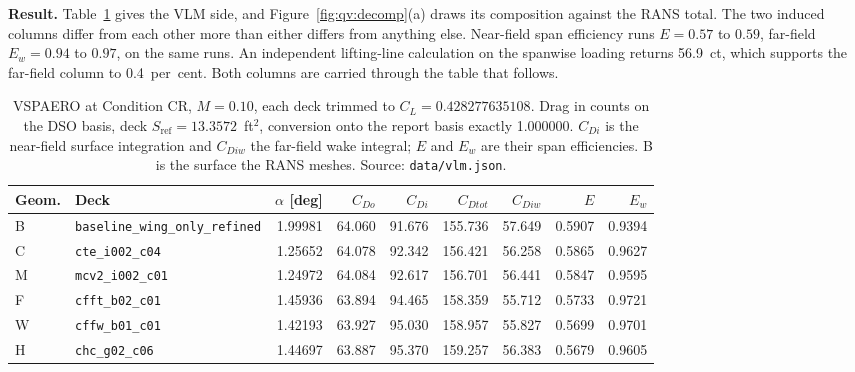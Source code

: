 \textbf{Result.} Table~\ref{tab:qv:vlm} gives the VLM side, and Figure~\ref{fig:qv:decomp}(a)
draws its composition against the RANS total. The two induced columns differ from each other more
than either differs from anything else. Near-field span efficiency runs $E = 0.57$ to $0.59$,
far-field $E_w = 0.94$ to $0.97$, on the same runs. An independent lifting-line calculation on the
spanwise loading returns 56.9~ct, which supports the far-field column to 0.4~per~cent. Both
columns are carried through the table that follows.
\begin{table}[htbp]
  \centering
  \footnotesize
  \caption{VSPAERO at Condition CR, $M = 0.10$, each deck trimmed to $C_L = 0.428277635108$.
  Drag in counts on the DSO basis, deck $S_\mathrm{ref} = 13.3572$~ft$^2$, conversion onto the
  report basis exactly 1.000000. $C_{Di}$ is the near-field surface integration and $C_{Diw}$ the
  far-field wake integral; $E$ and $E_w$ are their span efficiencies. B is the surface the RANS
  meshes. Source: \texttt{data/vlm.json}.}
  \label{tab:qv:vlm}
  \begin{tabular}{llrrrrrrr}
    \toprule
    Geom. & Deck & $\alpha$ [deg] & $C_{Do}$ & $C_{Di}$ & $C_{Dtot}$ & $C_{Diw}$ & $E$ & $E_w$ \\
    \midrule
    B & \texttt{baseline\_wing\_only\_refined} & 1.99981 & 64.060 & 91.676 & 155.736 & 57.649 & 0.5907 & 0.9394 \\
    C & \texttt{cte\_i002\_c04}                & 1.25652 & 64.078 & 92.342 & 156.421 & 56.258 & 0.5865 & 0.9627 \\
    M & \texttt{mcv2\_i002\_c01}               & 1.24972 & 64.084 & 92.617 & 156.701 & 56.441 & 0.5847 & 0.9595 \\
    F & \texttt{cfft\_b02\_c01}                & 1.45936 & 63.894 & 94.465 & 158.359 & 55.712 & 0.5733 & 0.9721 \\
    W & \texttt{cffw\_b01\_c01}                & 1.42193 & 63.927 & 95.030 & 158.957 & 55.827 & 0.5699 & 0.9701 \\
    H & \texttt{chc\_g02\_c06}                 & 1.44697 & 63.887 & 95.370 & 159.257 & 56.383 & 0.5679 & 0.9605 \\
    \bottomrule
  \end{tabular}
\end{table}

